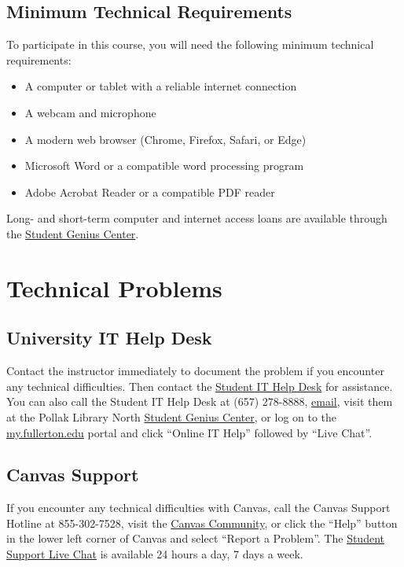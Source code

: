\documentclass[12pt, letterpaper]{article}
\begin{document}
\subsection*{Minimum Technical Requirements}

To participate in this course, you will need the following minimum technical requirements:
\begin{itemize}
    \item A computer or tablet with a reliable internet connection
    \item A webcam and microphone
    \item A modern web browser (Chrome, Firefox, Safari, or Edge)
    \item Microsoft Word or a compatible word processing program
    \item Adobe Acrobat Reader or a compatible PDF reader
\end{itemize}


\noindent Long- and short-term computer and internet access loans are available through the \href{http://www.fullerton.edu/it/students/sgc/index.php}{Student Genius Center}.

\section{Technical Problems}

\subsection*{University IT Help Desk}

Contact the instructor immediately to document the problem if you encounter any technical difficulties. Then contact the \href{http://www.fullerton.edu/it/students/helpdesk/index.php}{Student IT Help Desk} for assistance. You can also call the Student IT Help Desk at (657) 278-8888, \href{mailto:StudentITHelpDesk@fullerton.edu}{email}, visit them at the Pollak Library North \href{http://www.fullerton.edu/it/students/sgc/index.php}{Student Genius Center}, or log on to the \href{http://my.fullerton.edu/}{my.fullerton.edu} portal and click ``Online IT Help'' followed by ``Live Chat''.

\subsection*{Canvas Support}

If you encounter any technical difficulties with Canvas, call the Canvas Support Hotline at 855-302-7528, visit the \href{https://community.canvaslms.com/docs/DOC-10720-67952720329}{Canvas Community}, or click the ``Help'' button in the lower left corner of Canvas and select ``Report a Problem''. The \href{https://cases.canvaslms.com/liveagentchat?chattype=student&sfid=001A000000YzcwQIAR}{Student Support Live Chat} is available 24 hours a day, 7 days a week.
\end{document}
